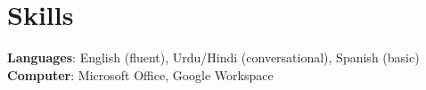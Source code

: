\documentclass[letterpaper,11pt]{article}
\begin{document}
\section{Skills}
 \begin{itemize}[leftmargin=0.15in, label={}]
    \small{\item{
     \textbf{Languages}{: English (fluent), Urdu/Hindi (conversational), Spanish (basic)} \\
     \textbf{Computer}{: Microsoft Office, Google Workspace}
    }}
 \end{itemize}
\end{document}
